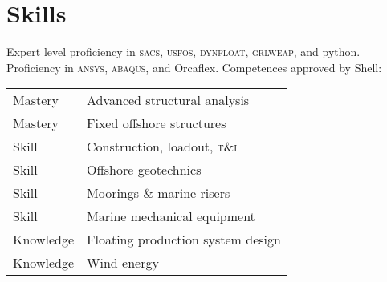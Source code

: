 \section*{Skills} %
\label{sec:comp}

Expert level proficiency in \textsc{sacs}, \textsc{usfos}, \textsc{dynfloat}, \textsc{grlweap}, and python. Proficiency in \textsc{ansys}, \textsc{abaqus}, and Orcaflex. Competences approved by Shell:

\noindent\begin{tabular}{l l}
  Mastery & Advanced structural analysis \\
  Mastery & Fixed offshore structures \\
  Skill & Construction, loadout, \textsc{t\&i} \\
  Skill & Offshore geotechnics \\
  Skill & Moorings \& marine risers \\
  Skill & Marine mechanical equipment \\
  Knowledge & Floating production system design \\
  Knowledge & Wind energy \\
\end{tabular}

